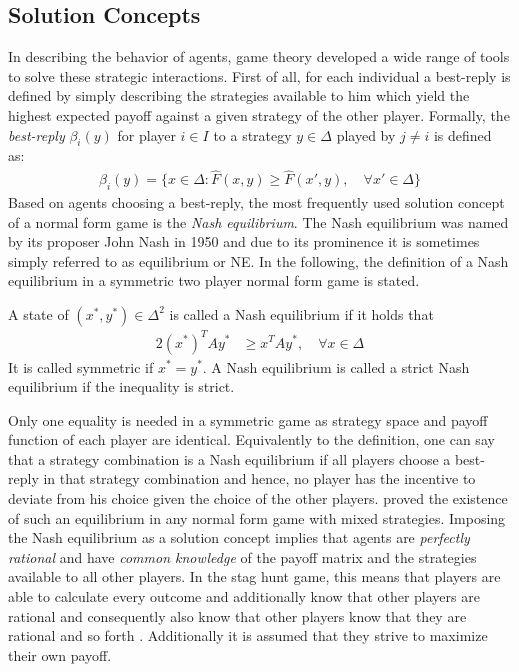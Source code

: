 \subsection{Solution Concepts}
\label{sec:traditionalconcepts}
In describing the behavior of agents, game theory developed a wide range of 
tools to solve these strategic interactions. First of all, for each individual
a best-reply is defined by simply describing the strategies available to him 
which yield the highest expected payoff against a given 
strategy of the other player.
Formally, the \textit{best-reply} $\beta_i(y)$ for player $i \in I$ to a 
strategy $y \in \Delta$ played by $j \neq i$ is defined as:
\begin{align}
        \label{eq:bestreply}
        \beta_i(y) = \{x \in \Delta: \hat{F}(x,y) \geq \hat{F}(x',y), 
        \quad \forall x' \in \Delta\}
\end{align}
Based on agents choosing a best-reply, the most frequently 
used solution concept of
a normal form game is the \textit{Nash equilibrium}.
The Nash equilibrium was named by its proposer John Nash in 1950 
and due to its prominence it is sometimes simply referred to as equilibrium 
or NE.
In the following, the definition of a Nash equilibrium in a symmetric two
player normal form game is stated. 
\begin{mydef}
        \label{def:nashequilibrium}
        A state of $(x^*,y^*) \in \Delta^2$ is called a Nash equilibrium if 
        it holds that
        \begin{alignat*}{2}
                (x^*)^T A y^* &\geq x^T A y^*, \quad \forall x \in \Delta 
        \end{alignat*}
It is called symmetric if $x^* = y^*$. A Nash equilibrium is called a 
strict Nash equilibrium if the inequality is strict.
\end{mydef}
Only one equality is needed in a symmetric game as strategy space and
payoff function of each player are identical.
Equivalently to the definition, one can say that a strategy combination 
is a Nash equilibrium if all players choose a best-reply in that strategy 
combination and hence, no player has the incentive to deviate from his 
choice given the choice of the other players.
\textcite{nash_equilibrium_1950} proved the existence of such 
an equilibrium in any normal form game with mixed strategies. 
Imposing the Nash equilibrium as a solution concept implies that 
agents are \textit{perfectly rational} and have \textit{common knowledge} 
of the payoff matrix and the strategies available to all other players. 
In the stag hunt game, this means that players are able to calculate every
outcome and additionally know that other players are rational and 
consequently also know that other players know that 
they are rational and so forth \parencite{fudenberg_theory_1998}. 
Additionally it is assumed that they strive to maximize their own payoff.

